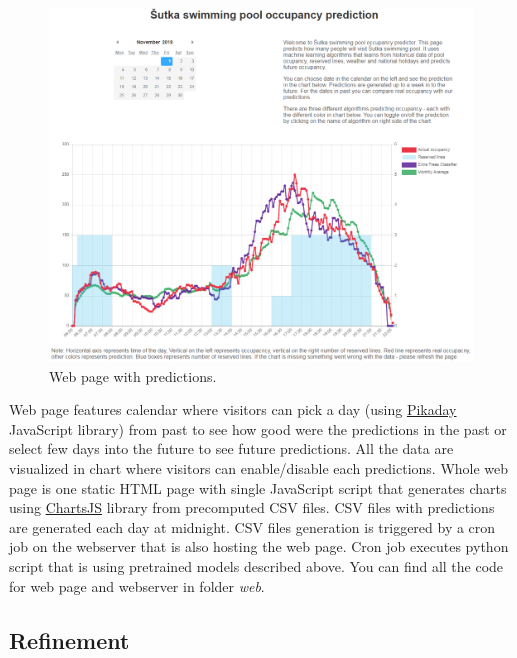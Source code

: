 \documentclass{article}
\begin{document}
\begin{figure}[h!]
\centering
\includegraphics[width=12cm]{imgs/webpage.png}
\caption{Web page with predictions.}
\label{fig:web}
\end{figure}

Web page features calendar where visitors can pick a day (using \href{https://github.com/Pikaday/Pikaday}{Pikaday} JavaScript library) from past to see how good were the predictions in the past or select few days into the future to see future predictions. All the data are visualized in chart where visitors can enable/disable each predictions. Whole web page is one static HTML page with single JavaScript script that generates charts using \href{https://www.chartjs.org/}{ChartsJS} library from precomputed CSV files. CSV files with predictions are generated each day at midnight. CSV files generation is triggered by a cron job on the webserver that is also hosting the web page. Cron job executes python script that is using pretrained models described above. You can find all the code for web page and webserver in folder \emph{web}.

\subsection{Refinement}
\end{document}

